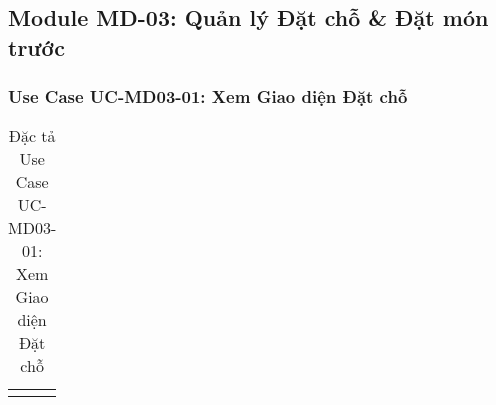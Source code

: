 \subsection{Module MD-03: Quản lý Đặt chỗ \& Đặt món trước}

\subsubsection{Use Case UC-MD03-01: Xem Giao diện Đặt chỗ}
\begin{longtable}{|m{4cm}|p{11cm}|}
\caption{Đặc tả Use Case UC-MD03-01: Xem Giao diện Đặt chỗ} \label{tab:uc_md03_01} \\
\hline

\endhead %

\hline
\endfoot %


\end{longtable}
